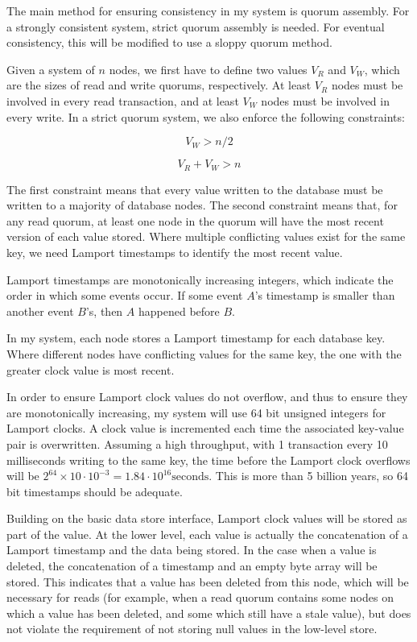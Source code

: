 \documentclass[12pt,a4paper,twoside,openright]{report}
\begin{document}
The main method for ensuring consistency in my system is quorum assembly. For a strongly consistent system, strict quorum assembly is needed. For eventual consistency, this will be modified to use a sloppy quorum method.

Given a system of $n$ nodes, we first have to define two values $V_R$ and $V_W$, which are the sizes of read and write quorums, respectively. At least $V_R$ nodes must be involved in every read transaction, and at least $V_W$ nodes must be involved in every write. In a strict quorum system, we also enforce the following constraints:

$$V_W > n / 2$$

$$V_R + V_W > n$$

The first constraint means that every value written to the database must be written to a majority of database nodes. The second constraint means that, for any read quorum, at least one node in the quorum will have the most recent version of each value stored. Where multiple conflicting values exist for the same key, we need Lamport timestamps to identify the most recent value.

Lamport timestamps are monotonically increasing integers, which indicate the order in which some events occur. If some event $A$'s timestamp is smaller than another event $B$'s, then $A$ happened before $B$.

In my system, each node stores a Lamport timestamp for each database key. Where different nodes have conflicting values for the same key, the one with the greater clock value is most recent.

In order to ensure Lamport clock values do not overflow, and thus to ensure they are monotonically increasing, my system will use 64 bit unsigned integers for Lamport clocks. A clock value is incremented each time the associated key-value pair is overwritten. Assuming a high throughput, with 1 transaction every 10 milliseconds writing to the same key, the time before the Lamport clock overflows will be $2^{64} \times 10 \cdot 10^{-3} = 1.84 \cdot 10^{16} \text{seconds}$. This is more than 5 billion years, so 64 bit timestamps should be adequate.

Building on the basic data store interface, Lamport clock values will be stored as part of the value. At the lower level, each value is actually the concatenation of a Lamport timestamp and the data being stored. In the case when a value is deleted, the concatenation of a timestamp and an empty byte array will be stored. This indicates that a value has been deleted from this node, which will be necessary for reads (for example, when a read quorum contains some nodes on which a value has been deleted, and some which still have a stale value), but does not violate the requirement of not storing null values in the low-level store.
\end{document}
